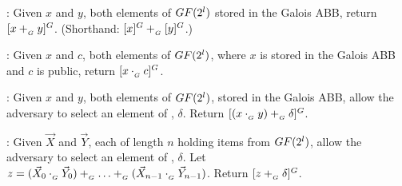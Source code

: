 \begin{functionality}
	: Given $x$ and $y$,
		both elements of $GF(2^l)$ stored in the Galois ABB,
		return $[x +_{_G} y]^{G}$. (Shorthand: $[x]^{G} +_{_G} [y]^{G}$.)

	: Given $x$ and $c$,
		both elements of $GF(2^l)$,
		where $x$ is stored in the Galois ABB and $c$ is public,
		return $[x \cdot_{_G} c]^{G}$.

	: Given $x$ and $y$,
		both elements of $GF(2^l)$, stored in the Galois ABB,
		allow the adversary to select an element of \GFtwol,
		$\delta$.
		Return $[(x \cdot_{_G} y) +_{_G} \delta]^{G}$.

	:
		Given $\vec{X}$ and $\vec{Y}$, each of length $n$
		holding items from $GF(2^l)$,
		allow the adversary to select an element of \GFtwol, $\delta$.
		Let $z = (\vec{X}_0 \cdot_{_G} \vec{Y}_0) +_{_G} \ldots 
			+_{_G} (\vec{X}_{n-1} \cdot_{_G} \vec{Y}_{n-1})$.
		Return $[z +_{_G} \delta]^{G}$.

\end{functionality}
